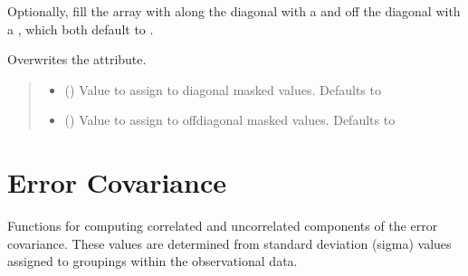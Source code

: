 \documentclass[letterpaper,10pt,english]{sphinxmanual}
\begin{document}
\begin{fulllineitems}
\begin{fulllineitems}
\sphinxAtStartPar
Optionally, fill the array with along the diagonal with a
 and off the diagonal with a , which both
default to .

\sphinxAtStartPar
Overwrites the  attribute.
\begin{quote}\begin{description}
\begin{itemize}
\item {}
\sphinxAtStartPar
{} () \textendash{} Value to assign to diagonal masked values. Defaults to 

\item {}
\sphinxAtStartPar
{} () \textendash{} Value to assign to off\sphinxhyphen{}diagonal masked values. Defaults to 

\end{itemize}

\sphinxAtStartPar
{}

\end{description}\end{quote}

\end{fulllineitems}


\end{fulllineitems}


\sphinxstepscope


\chapter{Error Covariance}
\label{\detokenize{error_covariance:module-glomar_gridding.error_covariance}}\label{\detokenize{error_covariance:error-covariance}}\label{\detokenize{error_covariance::doc}}
\sphinxAtStartPar
Functions for computing correlated and uncorrelated components of the error
covariance. These values are determined from standard deviation (sigma) values
assigned to groupings within the observational data.
\end{document}

